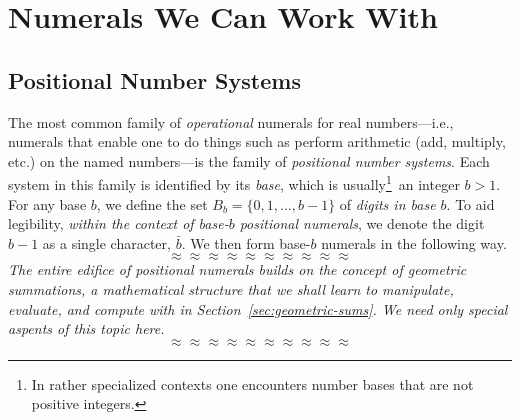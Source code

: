 \section{Numerals We Can Work With}
\label{sec:Numerals}


\subsection{Positional Number Systems}
\label{sec:positional-numbers}

The most common family of {\em operational}
 numerals for real numbers---i.e.,
numerals that enable one to do things such as perform arithmetic (add,
multiply, etc.) on the named numbers---is the family of {\it
  positional number systems}.  Each system in this family is
identified by its {\em base}, 
which is usually\footnote{In rather specialized contexts one
  encounters number bases that are not positive integers.}~an
integer $b >1$.
For any base $b$, we define the set $B_b = \{ 0, 1, \ldots, b-1\}$ of
{\it digits in base $b$}.
%
To aid legibility, {\em within the context of base-$b$ positional
  numerals}, we denote the digit $b-1$ as a single character, $\bar{b}$.
%
We then form base-$b$ numerals in the following way.
\[ \approx \approx \approx \approx \approx \approx \approx \approx \approx \approx \]
{\em The entire edifice of positional numerals builds on the concept
  of {\em geometric summations}, a mathematical structure that we
  shall learn to manipulate, evaluate, and compute with in
  Section~\ref{sec:geometric-sums}.  We need only special aspents of
  this topic here.
}
\[ \approx \approx \approx \approx \approx \approx \approx \approx \approx \approx \]

